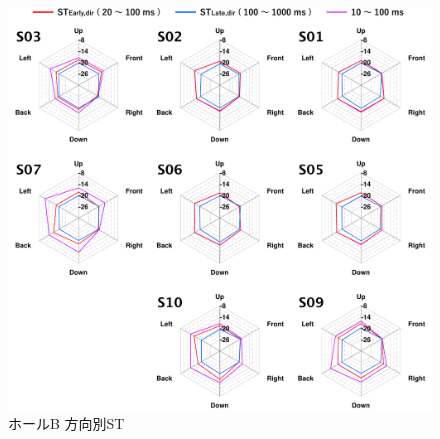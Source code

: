 \documentclass[11pt,a4j]{jreport}
\begin{document}
\begin{figure}[H]
  \centering
  \includegraphics[scale=.75]{images/realHallDirSt/allPoint/reshaped/b.pdf}
  \caption{ホールB 方向別ST}
  \label{fig:ホールB 方向別ST}
\end{figure}

\newpage
\vspace*{6\baselineskip}
\end{document}
